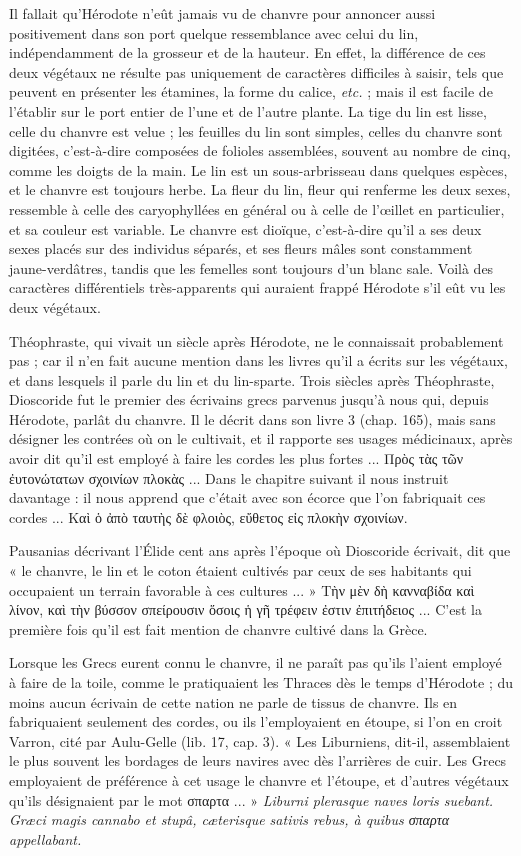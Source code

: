 \documentclass[a4paper, 11pt, oneside, polutonikogreek, french]{article}
\begin{document}
Il fallait qu'Hérodote n'eût jamais vu de chanvre pour annoncer aussi positivement dans son port quelque ressemblance avec celui du lin, indépendamment de la grosseur et de la hauteur. En effet, la différence de ces deux végétaux ne résulte pas uniquement de caractères difficiles à saisir, tels que peuvent en présenter les étamines, la forme du calice, \emph{etc.} ; mais il est facile de l'établir sur le port entier de l'une et de l'autre plante. La tige du lin est lisse, celle du chanvre est velue ; les feuilles du lin sont simples, celles du chanvre sont digitées, c'est-à-dire composées de folioles assemblées, souvent au nombre de cinq, comme les doigts de la main. Le lin est un sous-arbrisseau dans quelques espèces, et le chanvre est toujours herbe. La fleur du lin, fleur qui renferme les deux sexes, ressemble à celle des caryophyllées en général ou à celle de l'œillet en particulier, et sa couleur est variable. Le chanvre est dioïque, c'est-à-dire qu'il a ses deux sexes placés sur des individus séparés, et ses fleurs mâles sont constamment jaune-verdâtres, tandis que les femelles sont toujours d'un blanc sale. Voilà des caractères différentiels très-apparents qui auraient frappé Hérodote s'il eût vu les deux végétaux.

Théophraste, qui vivait un siècle après Hérodote, ne le connaissait probablement pas ; car il n'en fait aucune mention dans les livres qu'il a écrits sur les végétaux, et dans lesquels il parle du lin et du lin-sparte. Trois siècles après Théophraste, Dioscoride fut le premier des écrivains grecs parvenus jusqu'à nous qui, depuis Hérodote, parlât du chanvre. Il le décrit dans son livre 3 (chap. 165), mais sans désigner les contrées où on le cultivait, et il rapporte ses usages médicinaux, après avoir dit qu'il est employé à faire les cordes les plus fortes ... Πρὸς τὰς τῶν ἐυτονώτατων σχοινίων πλοκὰς ... Dans le chapitre suivant il nous instruit davantage : il nous apprend que c'était avec son écorce que l'on fabriquait ces cordes ... Καὶ ὁ ἀπὸ ταυτὴς δὲ φλοιὸς, εὔθετος εἰς πλοκὴν σχοινίων.

Pausanias décrivant l'Élide cent ans après l'époque où Dioscoride écrivait, dit que « le chanvre, le lin et le coton étaient cultivés par ceux de ses habitants qui occupaient un terrain favorable à ces cultures ... » Τὴν μὲν δὴ κανναβίδα καὶ λίνον, καὶ τὴν βύσσον σπείρουσιν ὅσοις ἡ γῆ τρέφειν ἐστιν ἐπιτήδειος ... C'est la première fois qu'il est fait mention de chanvre cultivé dans la Grèce.

Lorsque les Grecs eurent connu le chanvre, il ne paraît pas qu'ils l'aient employé à faire de la toile, comme le pratiquaient les Thraces dès le temps d'Hérodote ; du moins aucun écrivain de cette nation ne parle de tissus de chanvre. Ils en fabriquaient seulement des cordes, ou ils l'employaient en étoupe, si l'on en croit Varron, cité par Aulu-Gelle (lib. 17, cap. 3). « Les Liburniens, dit-il, assemblaient le plus souvent les bordages de leurs navires avec dès l’arrières de cuir. Les Grecs employaient de préférence à cet usage le chanvre et l'étoupe, et d'autres végétaux qu'ils désignaient par le mot σπαρτα ... » \emph{Liburni plerasque naves loris suebant. Græci magis cannabo et stupâ, cæterisque sativis rebus, à quibus σπαρτα appellabant.}
\end{document}
